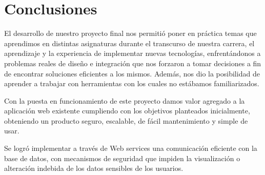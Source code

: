 
\chapter{Conclusiones}

El desarrollo de nuestro proyecto final nos permitió poner en práctica temas que aprendimos en distintas asignaturas durante el transcurso de nuestra carrera, el aprendizaje y la experiencia de implementar nuevas tecnologías, enfrentándonos a problemas reales de diseño e integración que nos forzaron a tomar decisiones a fin de encontrar soluciones eficientes a los mismos. Además, nos dio la posibilidad de aprender a trabajar con herramientas con los cuales no estábamos familiarizados.

Con la puesta en funcionamiento de este proyecto damos valor agregado a la aplicación web existente cumpliendo con los objetivos planteados inicialmente, obteniendo un producto seguro, escalable, de fácil mantenimiento y simple de usar.

Se logró implementar a través de Web services una comunicación eficiente con la base de datos, con mecanismos de seguridad que impiden la visualización o alteración indebida de los datos sensibles de los usuarios.


